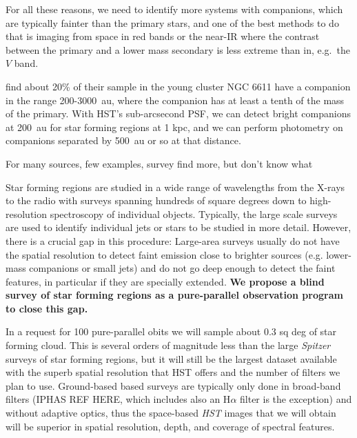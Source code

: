 \documentclass[12pt]{article}
\begin{document}
For all these reasons, we need to identify more systems with companions, which are typically fainter than the primary stars, and one of the best methods to do that is imaging from space in red bands or the near-IR where the contrast between the primary and a lower mass secondary is less extreme than in, e.g.\ the $V$ band. 

\citet{2001A&A...379..147D} find about 20\% of their sample in the young cluster NGC 6611 have a companion in the range 200-3000~au, where the companion has at least a tenth of the mass of the primary. With HST's sub-arcsecond PSF, we can detect bright companions at 200~au for star forming regions at 1 kpc, and we can perform photometry on companions separated by 500~au or so at that distance. 


For many sources, few examples, survey find more, but don't know what


Star forming regions are studied in a wide range of wavelengths from the X-rays to the radio with surveys spanning hundreds of square degrees down to high-resolution spectroscopy of individual objects. Typically, the large scale surveys are used to identify individual jets or stars to be studied in more detail. However, there is a crucial gap in this procedure: Large-area surveys usually do not have the spatial resolution to detect faint emission close to brighter sources (e.g. lower-mass companions or small jets) and do not go deep enough to detect the faint features, in particular if they are specially extended. \textbf{We propose a blind survey of star forming regions as a pure-parallel observation program to close this gap.}



In a request for 100 pure-parallel obits we will sample about 0.3 sq deg of star forming cloud. This is several orders of magnitude less than the large \emph{Spitzer} surveys of star forming regions, but it will still be the largest dataset available with the superb spatial resolution that HST offers and the number of filters we plan to use. Ground-based based surveys are typically only done in broad-band filters (IPHAS REF HERE, which includes also an H$\alpha$ filter is the exception) and without adaptive optics, thus the space-based \emph{HST} images that we will obtain will be superior in spatial resolution, depth, and coverage of spectral features.
\end{document}
